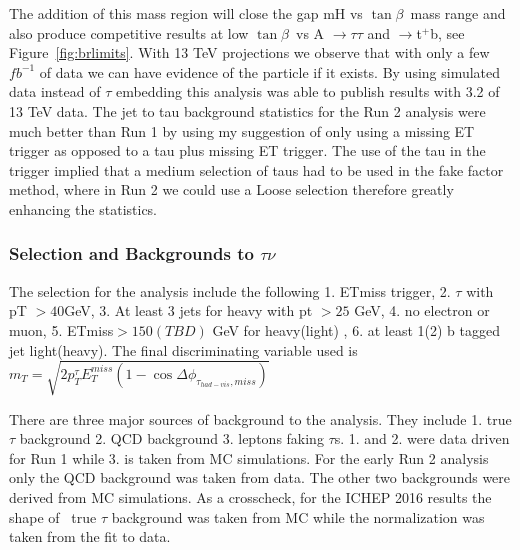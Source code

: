 \documentclass[11pt]{article}
\newcommand{\tanb}{$\tan \beta$}
\newcommand{\too}{$\rightarrow$}
\begin{document}
The addition of this mass region will close the gap mH vs \tanb\ mass range and also produce competitive results at low \tanb\ vs A \too $\tau \tau$ and \Hp \too t$^+$b, see Figure~\ref{fig:brlimits}.  With 13 TeV projections we observe that with only a few $fb^{-1}$ of data we can have evidence of the particle if it exists.
By using simulated \ttbar data instead of $\tau$ embedding this analysis was able to publish results with 3.2 \invfb of 13 TeV data. The jet to tau background statistics for the Run 2 analysis were much better than Run 1
by using my suggestion of only using a missing ET trigger as opposed to a tau plus missing ET trigger.  The use of the tau in the trigger implied that a medium selection of taus had to be used in the fake factor method, where in Run 2 we could use a Loose selection therefore greatly enhancing the statistics.

\subsubsection{Selection and Backgrounds to \Hp $\tau\nu$}
The selection for the \Hp analysis include the following 1.  ETmiss trigger, 2. $\tau$ with pT $> 40 $GeV, 3. At least 3 jets for heavy \Hp with pt $> 25$ GeV, 4. no electron or muon,
5. ETmiss$ > 150(TBD)$ GeV for heavy(light) \Hp, 6.  at least 1(2) b tagged jet light(heavy).  The final discriminating variable used is 
$m_T = \sqrt{ 2p^\tau_TE^{miss}_T(1-\cos {\Delta \phi_{\tau_{had-vis},miss}})}  $

There are three major sources of background to the \Hp analysis.  They include 1. true $\tau$ background 2. QCD background 3. leptons faking $\tau$s.  1. and 2. were data driven for Run 1 while 3. is taken from MC simulations.  
For the early Run 2 analysis only the QCD background was taken from data.  The other two backgrounds were derived from MC simulations. As a crosscheck, for the ICHEP 2016 results the shape of \ttbar\, true $\tau$ background was taken
from MC while the normalization was taken from the fit to data.
\end{document}
